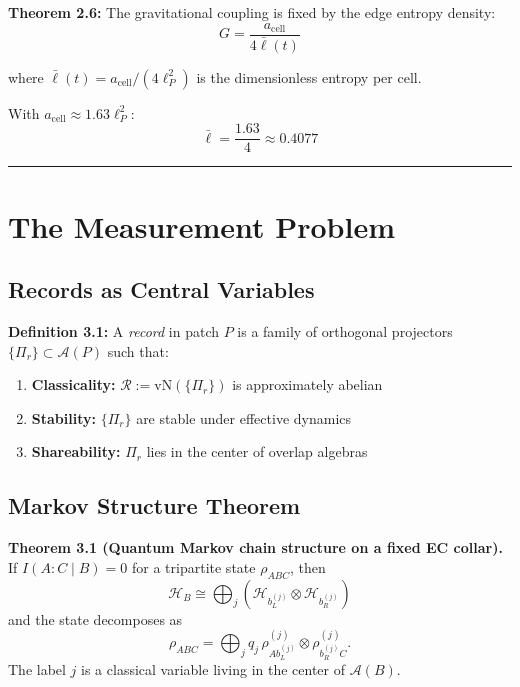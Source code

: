 \textbf{Theorem 2.6:} The gravitational coupling is fixed by the edge entropy density: \[G = \frac{a_{\text{cell}}}{4\bar{\ell}(t)}\]

where \(\bar{\ell}(t) = a_{\text{cell}}/(4\ell_P^2)\) is the dimensionless entropy per cell.

With \(a_{\text{cell}} \approx 1.63 \ell_P^2\): \[\bar{\ell} = \frac{1.63}{4} \approx 0.4077\]

\begin{center}\rule{0.5\linewidth}{0.5pt}\end{center}

\section{The Measurement Problem}\label{3-the-measurement-problem}

\subsection{Records as Central Variables}\label{31-records-as-central-variables}

\textbf{Definition 3.1:} A \emph{record} in patch \(P\) is a family of orthogonal projectors \(\{\Pi_r\} \subset \mathcal{A}(P)\) such that:

\begin{enumerate}
\def\labelenumi{\arabic{enumi}.}
\tightlist
\item
 \textbf{Classicality:} \(\mathcal{R} := \text{vN}(\{\Pi_r\})\) is approximately abelian
\item
 \textbf{Stability:} \(\{\Pi_r\}\) are stable under effective dynamics
\item
 \textbf{Shareability:} \(\Pi_r\) lies in the center of overlap algebras
\end{enumerate}

\subsection{Markov Structure Theorem}\label{32-markov-structure-theorem}

\textbf{Theorem 3.1 (Quantum Markov chain structure on a fixed EC collar).} If \(I(A:C\mid B)=0\) for a tripartite state \(\rho_{ABC}\), then
\[
\mathcal H_B
\cong
\bigoplus_j
\left(
\mathcal H_{b_L^{(j)}}\otimes \mathcal H_{b_R^{(j)}}
\right)
\]
and the state decomposes as
\[
\rho_{ABC}
=
\bigoplus_j
q_j\,
\rho^{(j)}_{A b_L^{(j)}}\otimes \rho^{(j)}_{b_R^{(j)} C}.
\]
The label \(j\) is a classical variable living in the center of \(\mathcal A(B)\).

